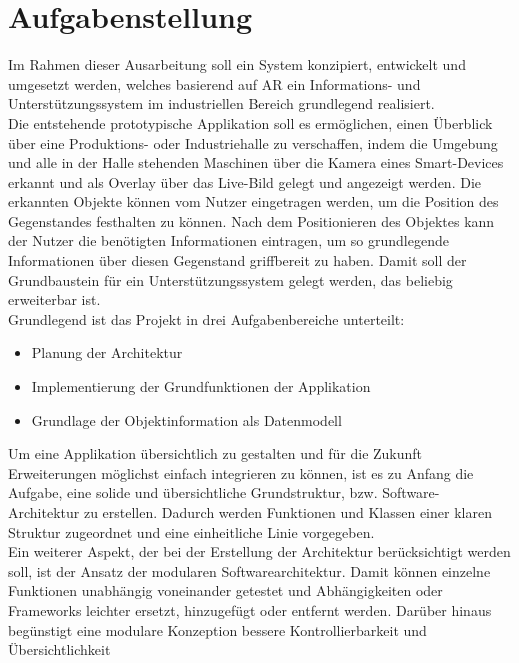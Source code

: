 \section{Aufgabenstellung}
\label{chap:Aufgabenstellung}          %
Im Rahmen dieser Ausarbeitung soll ein System konzipiert, entwickelt und umgesetzt werden, welches basierend auf \acl{AR} ein 
Informations- und Unterstützungssystem im industriellen Bereich grundlegend realisiert.
\\
Die entstehende prototypische Applikation soll es ermöglichen, einen Überblick über eine Produktions- oder Industriehalle zu 
verschaffen, indem die Umgebung und alle in der Halle stehenden Maschinen über die Kamera eines Smart-Devices erkannt und als 
Overlay über das Live-Bild gelegt und angezeigt werden. Die erkannten Objekte können vom Nutzer eingetragen werden, um die Position des 
Gegenstandes festhalten zu können. Nach dem Positionieren des Objektes kann der Nutzer die benötigten Informationen eintragen, um so %
grundlegende Informationen über diesen Gegenstand griffbereit zu haben. Damit soll der Grundbaustein für ein 
Unterstützungssystem gelegt werden, das beliebig erweiterbar ist. %
\\ 
\linebreak
Grundlegend ist das Projekt in drei Aufgabenbereiche unterteilt:
\begin{itemize}
    \item Planung der Architektur
    \item Implementierung der Grundfunktionen der Applikation
    \item Grundlage der Objektinformation als Datenmodell 
\end{itemize}
Um eine Applikation übersichtlich zu gestalten und für die Zukunft Erweiterungen 
möglichst einfach integrieren zu können, ist es zu Anfang die Aufgabe, eine solide und übersichtliche Grundstruktur, bzw. Software-
Architektur zu erstellen. Dadurch werden Funktionen und Klassen einer klaren Struktur zugeordnet und eine einheitliche Linie vorgegeben. 
\\
Ein weiterer Aspekt, der bei der Erstellung der Architektur berücksichtigt werden soll, ist der Ansatz der modularen 
Softwarearchitektur. Damit können einzelne Funktionen unabhängig voneinander getestet und Abhängigkeiten oder Frameworks leichter 
ersetzt, hinzugefügt oder entfernt werden. Darüber hinaus begünstigt eine modulare Konzeption bessere Kontrollierbarkeit und Übersichtlichkeit 
